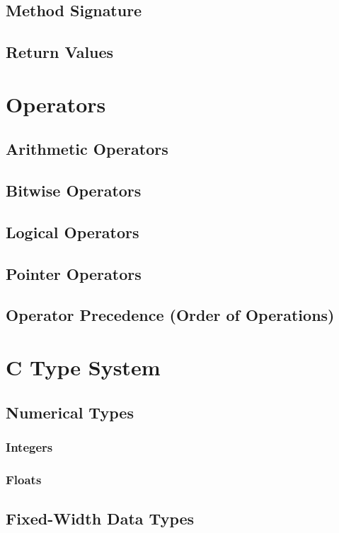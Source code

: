 \documentclass[14pt,table]{extbook}
\begin{document}
			\section{Method Signature}
			\section{Return Values}

		\chapter{Operators}
			\section{Arithmetic Operators}
			\section{Bitwise Operators}
			\section{Logical Operators}
			\section{Pointer Operators}
			\section{Operator Precedence (Order of Operations)}

		\chapter{C Type System}
			\section{Numerical Types}
				\subsection{Integers}
				\subsection{Floats}

			\section{Fixed-Width Data Types}
\end{document}
